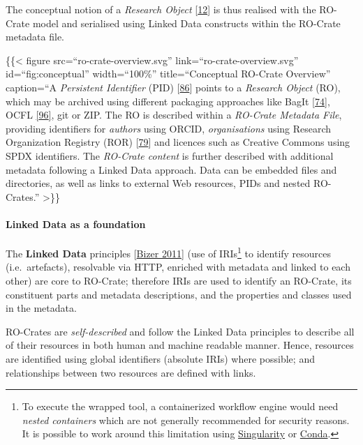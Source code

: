 The conceptual notion of a \emph{Research Object}
{[}\href{https://www.research.manchester.ac.uk/portal/en/publications/why-linked-data-is-not-enough-for-scientists(479e591e-b295-4478-b0c7-a145c19dcd45).html}{12}{]}
is thus realised with the RO-Crate model and serialised using Linked
Data constructs within the RO-Crate metadata file.

\{\{\textless{} figure src=``ro-crate-overview.svg''
link=``ro-crate-overview.svg'' id=``fig:conceptual'' width=``100\%''
title=``Conceptual RO-Crate Overview'' caption=``A \emph{Persistent
Identifier} (PID)
{[}\href{https://doi.org/10.1371/journal.pbio.2001414}{86}{]} points to
a \emph{Research Object} (RO), which may be archived using different
packaging approaches like BagIt
{[}\href{https://doi.org/10.17487/rfc8493}{74}{]}, OCFL
\href{https://ocfl.io/1.0/spec/}{{[}96{]}}, git or ZIP. The RO is
described within a \emph{RO-Crate Metadata File}, providing identifiers
for \emph{authors} using ORCID, \emph{organisations} using Research
Organization Registry (ROR)
{[}\href{https://doi.org/10.6087/kcse.192}{79}{]} and licences such as
Creative Commons using SPDX identifiers. The \emph{RO-Crate content} is
further described with additional metadata following a Linked Data
approach. Data can be embedded files and directories, as well as links
to external Web resources, PIDs and nested RO-Crates.'' \textgreater\}\}

\hypertarget{linkeddata}{%
\paragraph{Linked Data as a foundation}\label{linkeddata}}

The \textbf{Linked Data} principles
{[}\href{https://doi.org/10.4018/978-1-60960-593-3.ch008}{Bizer 2011}{]} (use of
IRIs\footnote{To execute the wrapped tool, a containerized workflow
  engine would need \emph{nested containers} which are not generally
  recommended for security reasons. It is possible to work around this
  limitation using \href{https://sylabs.io/singularity/}{Singularity} or
  \href{https://docs.bioexcel.eu/cwl-best-practice-guide/devpractice/containers/conda.html}{Conda}.}
to identify resources (i.e.~artefacts), resolvable via HTTP, enriched
with metadata and linked to each other) are core to RO-Crate; therefore
IRIs are used to identify an RO-Crate, its constituent parts and
metadata descriptions, and the properties and classes used in the
metadata.

RO-Crates are \emph{self-described} and follow the Linked Data
principles to describe all of their resources in both human and machine
readable manner. Hence, resources are identified using global
identifiers (absolute IRIs) where possible; and relationships between
two resources are defined with links.

